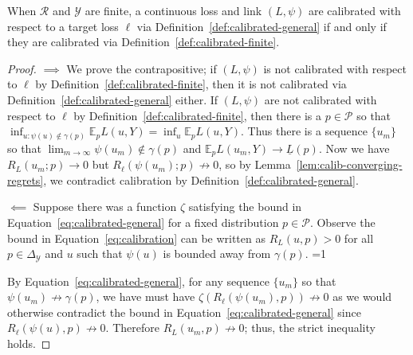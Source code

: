 \documentclass[anon,12pt]{colt2021} %
\newcommand{\Comments}{1}
\newcommand{\mytodo}[2]{\ifnum\Comments=1%
	\todo[linecolor=#1!80!black,backgroundcolor=#1,bordercolor=#1!80!black]{#2}\fi}
\newcommand{\jessiet}[1]{\mytodo{purple!20!white}{JF: #1}}
\newcommand{\btw}[1]{\mytodo{orange!80!white}{BTW: #1}}
\newcommand{\simplex}{\Delta_\Y}
\newcommand{\E}{\mathbb{E}}
\newcommand{\R}{\mathcal{R}}
\renewcommand{\P}{\mathcal{P}}
\newcommand{\Y}{\mathcal{Y}}
\newcommand{\exploss}[3]{\E_{#3} #1(#2,Y)}
\newcommand{\risk}[1]{\underline{#1}}
\begin{document}
\begin{proposition}
	When $\R$ and $\Y$ are finite, a continuous loss and link $(L, \psi)$ are calibrated with respect to a target loss $\ell$ via Definition~\ref{def:calibrated-general} if and only if they are calibrated via Definition~\ref{def:calibrated-finite}.
\end{proposition}
\begin{proof}
$\implies$
	We prove the contrapositive; if $(L, \psi)$ is not calibrated with respect to $\ell$ by Definition~\ref{def:calibrated-finite}, then it is not calibrated via Definition~\ref{def:calibrated-general} either.
	If $(L, \psi)$ are not calibrated with respect to $\ell$ by Definition~\ref{def:calibrated-finite}, then there is a $p \in \P$ so that $\inf_{u : \psi(u) \not \in \gamma(p)} \exploss{L}{u}{p} = \inf_u \exploss{L}{u}{p}$.
	Thus there is a sequence $\{u_m\}$ so that $\lim_{m \to \infty} \psi(u_m) \not \in \gamma(p)$ and $\exploss{L}{u_m}{p} \to \risk{L}(p)$.  
	Now we have $R_L(u_m; p) \to 0$ but $R_\ell(\psi(u_m); p) \not \to 0$, so by Lemma~\ref{lem:calib-converging-regrets}, we contradict calibration by Definition~\ref{def:calibrated-general}.
%	
%	
%	

$\impliedby$
Suppose there was a function $\zeta$ satisfying the bound in Equation~\eqref{eq:calibrated-general} for a fixed distribution $p \in \P$.
Observe the bound in Equation~\eqref{eq:calibration} can be written as $R_L(u,p) > 0$ for all $p \in \simplex$ and $u$ such that $\psi(u)$ is bounded away from $\gamma(p)$. \jessiet{details correct??}

By Equation~\eqref{eq:calibrated-general}, for any sequence $\{u_m\}$ so that $\psi(u_m) \not \to \gamma(p)$, we have must have $\zeta(R_\ell(\psi(u_m), p)) \not \to 0$ as we would otherwise contradict the bound in Equation~\eqref{eq:calibrated-general} since $R_\ell(\psi(u), p) \not \to 0$. 
Therefore $R_L(u_m, p) \not \to 0$; thus, the strict inequality holds.
\end{proof}
\end{document}
